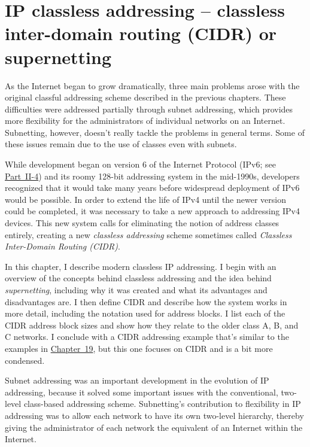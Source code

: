 \chapter[IP classless addressing -- CIDR or supernetting]{IP classless addressing -- classless inter-domain routing (CIDR) or supernetting}
\label{chap:kozierok-ch20}

As the Internet began to grow dramatically, three main problems arose
with the original classful addressing scheme described in the previous
chapters. These difficulties were addressed partially through subnet
addressing, which provides more flexibility for the administrators of
individual networks on an Internet. Subnetting, however, doesn't really
tackle the problems in general terms. Some of these issues remain due to
the use of classes even with subnets.

While development began on version 6 of the Internet Protocol
(\protect\hypertarget{ch20.htmlux5cux23idx-CHP-20-0756}{}{}IPv6; see
\protect\hyperlink{pt07.html}{Part~II-4}) and its roomy 128-bit
addressing system in the mid-1990s, developers recognized that it would
take many years before widespread deployment of IPv6 would be possible.
In order to extend the life of IPv4 until the newer version could be
completed, it was necessary to take a new approach to addressing IPv4
devices. This new system calls for eliminating the notion of address
classes entirely, creating a new {\emph{classless addressing}} scheme
sometimes called {\emph{Classless Inter-Domain Routing
(CIDR)}}\protect\hypertarget{ch20.htmlux5cux23idx-CHP-20-0757}{}{}.

In this chapter, I describe modern classless IP addressing. I begin with
an overview of the concepts behind classless addressing and the idea
behind {\emph{supernetting}}, including why it was created and what its
advantages and disadvantages are. I then define
\protect\hypertarget{ch20.htmlux5cux23idx-CHP-20-0758}{}{}CIDR and
describe how the system works in more detail, including the notation
used for address blocks. I list each of the CIDR address block sizes and
show how they relate to the older class A, B, and C networks. I conclude
with a CIDR addressing example that's similar to the examples in
\protect\hyperlink{ch19.html}{Chapter~19}, but this one focuses on CIDR
and is a bit more condensed.

Subnet addressing was an important development in the evolution of IP
addressing, because it solved some important issues with the
conventional, two-level class-based addressing scheme. Subnetting's
contribution to flexibility in IP addressing was to allow each network
to have its own two-level hierarchy, thereby giving the administrator of
each network the equivalent of an Internet within the Internet.

